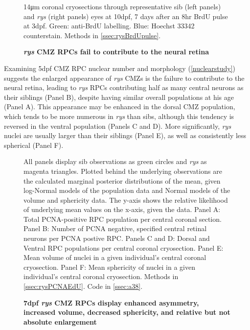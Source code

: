 \begin{figure}[!h]
    \caption{{\bf \textit{rys} CMZ RPCs fail to contribute to the neural retina}}
    14\si{\micro\metre} coronal cryosections through representative sib (left panels) and \textit{rys} (right panels) eyes at 10dpf, 7 days after an 8hr BrdU pulse at 3dpf. Green: anti-BrdU labelling. Blue: Hoechst 33342 counterstain.
    Methods in \autoref{ssec:rysBrdUpulse}.
    \label{a35kdes}
\end{figure}

Examining 5dpf CMZ RPC nuclear number and morphology (\autoref{nuclearstudy}) suggests the enlarged appearance of \textit{rys} CMZs is the failure to contribute to the neural retina, leading to \textit{rys} RPCs contributing half as many central neurons as their siblings (Panel B), despite having similar overall populations at his age (Panel A). This appearance may be enhanced in the dorsal CMZ population, which tends to be more numerous in \textit{rys} than sibs, although this tendency is reversed in the ventral population (Panels C and D). More significantly, \textit{rys} nuclei are usually larger than their siblings (Panel E), as well as consistently less spherical (Panel F).

\begin{figure}[!h]
    \caption{{\bf 7dpf \textit{rys} CMZ RPCs display enhanced asymmetry, increased volume, decreased sphericity, and relative but not absolute enlargement}}
    \label{nuclearstudy}
    All panels display sib observations as green circles and \textit{rys} as magenta triangles. Plotted behind the underlying observations are the calculated marginal posterior distributions of the mean, given log-Normal models of the population data and Normal models of the volume and sphericity data. The y-axis shows the relative likelihood of underlying mean values on the x-axis, given the data.
    Panel A: Total PCNA-positive RPC population per central coronal section.
    Panel B: Number of PCNA negative, specified central retinal neurons per PCNA postive RPC.
    Panels C and D: Dorsal and Ventral RPC populations per central coronal cryosection.
    Panel E: Mean volume of nuclei in a given individual's central coronal cryosection.
    Panel F: Mean sphericity of nuclei in a given individual's central coronal cryosection.
    Methods in \autoref{ssec:rysPCNAEdU}.
    Code in \autoref{ssec:a38}.
\end{figure}

